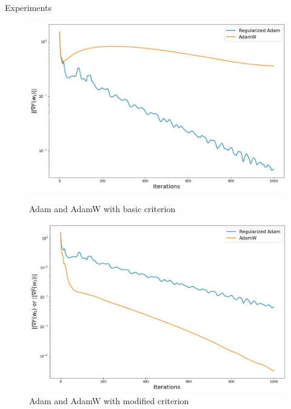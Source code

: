 \documentclass[aspectratio=169, 12pt]{beamer}
\begin{document}
\begin{frame}{Experiments}
   \begin{figure}[H]
\begin{minipage}[h]{0.49\linewidth}
\centering
\includegraphics[width=\linewidth]{adams_errors.jpeg}

\caption{Adam and AdamW with basic criterion}
\label{fig:adams_errors}
\end{minipage}
\hfill
\begin{minipage}[h]{0.49\linewidth}
\includegraphics[width=\linewidth]{adams_special_errors.jpeg}

\caption{Adam and AdamW with modified criterion}
\label{fig:adams_special_errors}
\end{minipage}
\end{figure}
\end{frame}
\end{document}
